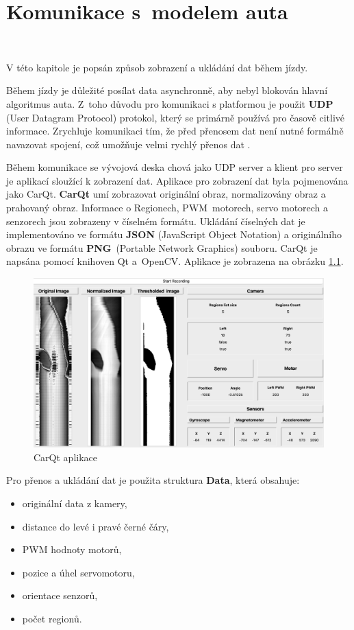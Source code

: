 \chapter{Komunikace s~modelem auta}
\label{sec:PlatformCommunication}\

V této kapitole je popsán způsob zobrazení a ukládání dat během jízdy.

Během jízdy je důležité posílat data asynchronně, aby nebyl blokován hlavní
algoritmus auta. Z~toho důvodu pro komunikaci s platformou je použit \textbf{UDP}
(User Datagram Protocol) protokol, který se primárně používá pro časově citlivé
informace. Zrychluje komunikaci tím, že před přenosem dat není nutné formálně
navazovat spojení, což umožňuje velmi rychlý přenos dat \cite{UDP}.

Během komunikace se vývojová deska chová jako UDP server a klient pro server je
aplikací sloužící k zobrazení dat. Aplikace pro zobrazení dat byla pojmenována jako
CarQt. \textbf{CarQt} umí zobrazovat originální obraz, normalizovány obraz
a prahovaný obraz. Informace o Regionech, PWM~motorech, servo motorech a senzorech
jsou zobrazeny v číselném formátu. Ukládání číselných dat je implementováno ve
formátu \textbf{JSON} (JavaScript Object Notation) a originálního obrazu ve formátu
\textbf{PNG}~(Portable Network Graphics) souboru. CarQt je napsána pomocí knihoven
Qt a~OpenCV. Aplikace je zobrazena na obrázku \ref{fig:CarQt}.

\begin{figure}[!h]
    \centering
    \vspace{-10pt}
    \includegraphics[width = .8\linewidth]{Figures/CarQt.png}
    \caption{CarQt aplikace}
    \label{fig:CarQt}
    \vspace{-15pt}
\end{figure}

Pro přenos a ukládání dat je použita struktura \textbf{Data}, která obsahuje:
\begin{itemize}
    \item originální data z kamery,
    \item distance do levé i pravé černé čáry,
    \item PWM hodnoty motorů,
    \item pozice a úhel servomotoru,
    \item orientace senzorů,
    \item počet regionů.
\end{itemize}

